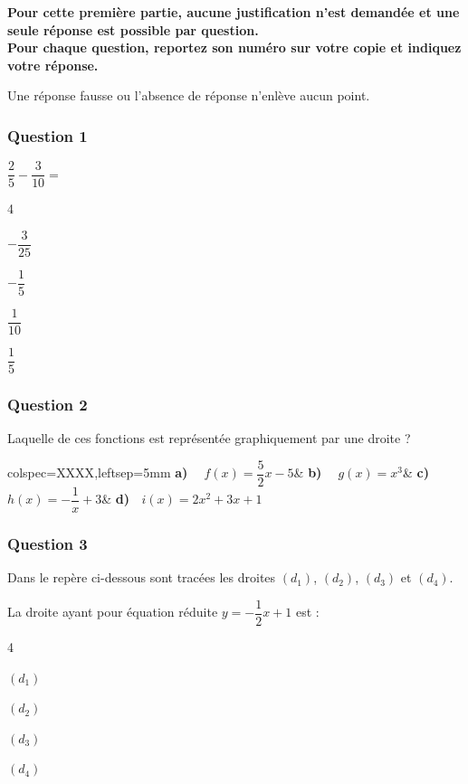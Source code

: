 \textbf{Pour cette première partie, aucune justification n'est demandée et une seule réponse est possible par question.\\
	Pour chaque question, reportez son numéro sur votre copie et indiquez votre réponse.}

	Une réponse fausse ou l'absence de réponse n'enlève aucun point.

\subsubsection*{Question 1}
\mbox{$\dfrac25-\dfrac{3}{10}=$}
		\begin{enumerate}[label=\textbf{\alph*)}]
\begin{multicols}{4}
			\item \mbox{$-\dfrac{3}{25}$}
			\item \mbox{$-\dfrac15$}
			\item \mbox{$\dfrac{1}{10}$}
			\item \mbox{$\dfrac15$}
				\end{multicols}
		\end{enumerate}

		\subsubsection*{Question 2}

Laquelle de ces fonctions est représentée graphiquement par une droite ?

		\begin{tblr}{colspec={XXXX},leftsep=5mm}
			\textbf{a) ~} \mbox{$f(x)=\dfrac52 x-5$}&
			\textbf{b) ~} \mbox{$g(x)=x^3$}&
			\textbf{c) ~} \mbox{$h(x)=-\dfrac1 x +3$}&
			\textbf{d) ~}\mbox{$i(x)=2x^2+3x+1$}
		\end{tblr}

\subsubsection*{Question 3}
	Dans le repère ci-dessous sont tracées les droites $(d_1)$, $(d_2)$, $(d_3)$ et $(d_4)$.

	La droite ayant pour équation réduite \quad\mbox{$y=-\dfrac12 x +1$} \quad est :
	\begin{enumerate}[label=\textbf{\alph*)}]
		\begin{multicols}{4}
			\item $(d_1)$
			\item $(d_2)$
			\item $(d_3)$
			\item $(d_4)$
		\end{multicols}
	\end{enumerate}

